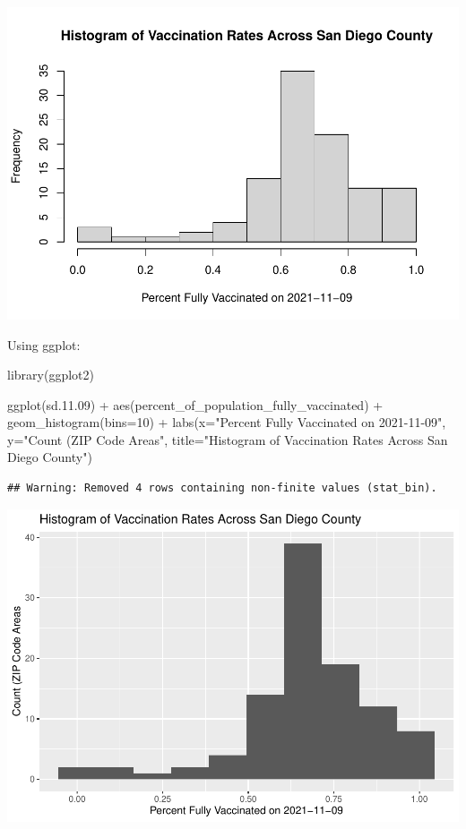\documentclass[
]{article}
\newenvironment{Shaded}{\begin{snugshade}}{\end{snugshade}}
\newcommand{\AttributeTok}[1]{\textcolor[rgb]{0.77,0.63,0.00}{#1}}
\newcommand{\DecValTok}[1]{\textcolor[rgb]{0.00,0.00,0.81}{#1}}
\newcommand{\FloatTok}[1]{\textcolor[rgb]{0.00,0.00,0.81}{#1}}
\newcommand{\FunctionTok}[1]{\textcolor[rgb]{0.00,0.00,0.00}{#1}}
\newcommand{\NormalTok}[1]{#1}
\newcommand{\SpecialCharTok}[1]{\textcolor[rgb]{0.00,0.00,0.00}{#1}}
\newcommand{\StringTok}[1]{\textcolor[rgb]{0.31,0.60,0.02}{#1}}
\begin{document}
\includegraphics{Class17_files/figure-latex/unnamed-chunk-28-1.pdf}

Using ggplot:

\begin{Shaded}
\begin{Highlighting}[]
\FunctionTok{library}\NormalTok{(ggplot2)}

\FunctionTok{ggplot}\NormalTok{(sd.}\FloatTok{11.09}\NormalTok{) }\SpecialCharTok{+}
  \FunctionTok{aes}\NormalTok{(percent\_of\_population\_fully\_vaccinated) }\SpecialCharTok{+}
  \FunctionTok{geom\_histogram}\NormalTok{(}\AttributeTok{bins=}\DecValTok{10}\NormalTok{) }\SpecialCharTok{+}
  \FunctionTok{labs}\NormalTok{(}\AttributeTok{x=}\StringTok{"Percent Fully Vaccinated on 2021{-}11{-}09"}\NormalTok{, }\AttributeTok{y=}\StringTok{"Count (ZIP Code Areas"}\NormalTok{,}
       \AttributeTok{title=}\StringTok{"Histogram of Vaccination Rates Across San Diego County"}\NormalTok{)}
\end{Highlighting}
\end{Shaded}

\begin{verbatim}
## Warning: Removed 4 rows containing non-finite values (stat_bin).
\end{verbatim}

\includegraphics{Class17_files/figure-latex/unnamed-chunk-29-1.pdf}
\end{document}
